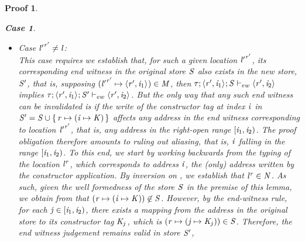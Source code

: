 \documentclass[showabstract,showacknowledgments,showpreface,showdedication]{iuphd}
\newtheorem*{bcase}{Case}
\theoremstyle{nonumberplain}
\newtheorem{nproof}{Proof}
\begin{document}
\begin{nproof}
\begin{bcase}
\begin{itemize}
\begin{itemize}
\begin{itemize}
           Finally, to discharge this case, the end witnesses of the constructor
           arguments established in lines~\ref{prf:dc-ew-f1} and~\ref{prf:dc-ew-f2}
           need to hold for the new store
           $\STOR' = \STOR \cup \set{\reg \mapsto (\ind \mapsto \DC)}$.
           To this end, in $\STOR'$, the newly
           written tag at address $\ind$ cannot overlap with the cells
           occupied by any of the constructor arguments.
           Therefore, the desired end witnesses exist in $\STOR'$, thereby
           discharging this case.
      \item Case ${\mathit{l}'}^{\mathit{r}'} \neq \mathit{l}$: \\
      This case requires we establish that, for such a given location ${\mathit{l}'}^{\mathit{r}'}$, its
      corresponding end witness in the original store $\mathit{S}$ also exists
      in the new store, $\STOR'$, that is, supposing $({\mathit{l}'}^{\mathit{r}'} \mapsto \langle \mathit{r}', \mathit{i}_1 \rangle ^{}) \in \mathit{M}$, then $\mathit{\tau};\langle \mathit{r}', \mathit{i}_1 \rangle ^{};\mathit{S} \vdash_{ew} \langle \mathit{r}', \mathit{i}_2 \rangle ^{}$ implies $\mathit{\tau};\langle \mathit{r}', \mathit{i}_1 \rangle ^{};\mathit{S}' \vdash_{ew} \langle \mathit{r}', \mathit{i}_2 \rangle ^{}$.
      But the only way that any such end witness can be invalidated
      is if the write of the constructor tag at index $\ind$ in
      $\STOR' = \STOR \cup \set{\reg \mapsto (\ind \mapsto \DC)}$ affects
      any address in the end witness corresponding
      to location ${\mathit{l}'}^{\mathit{r}'}$, that is, any address
      in the right-open range $[\mathit{i}_1, \mathit{i}_2)$.
      The proof obligation therefore amounts to ruling out 
      aliasing, that is, $\ind$ falling in the range
      $[\mathit{i}_1, \mathit{i}_2)$.
      To this end, we start by working backwards from the typing of
      the location ${\mathit{l}}^{\mathit{r}}$, which corresponds to address $\ind$, the (only) address
      written by the constructor application.
      By inversion on \tdatacon{}, we establish that ${\mathit{l}}^{\mathit{r}} \in \mathit{N}$.
      As such, given the well formedness of the store $\mathit{S}$ in the premise
      of this lemma, we obtain
      from 
      that
      $(\mathit{r} \mapsto (\mathit{i} \mapsto \mathit{K})) \not \in \mathit{S}$.
      However, by the end-witness rule, for each $\mathit{j} \in [\mathit{i}_1, \mathit{i}_2)$,
      there exists a mapping from the address in the original store to its constructor tag
      $\mathit{K}_j$, which is
      $(\mathit{r} \mapsto (\mathit{j} \mapsto \mathit{K}_j)) \in \mathit{S}$.
      Therefore, the end witness judgement remains valid in store $\STOR'$,

\end{itemize}
\end{itemize}
\end{itemize}
\end{bcase}
\end{nproof}
\end{document}
